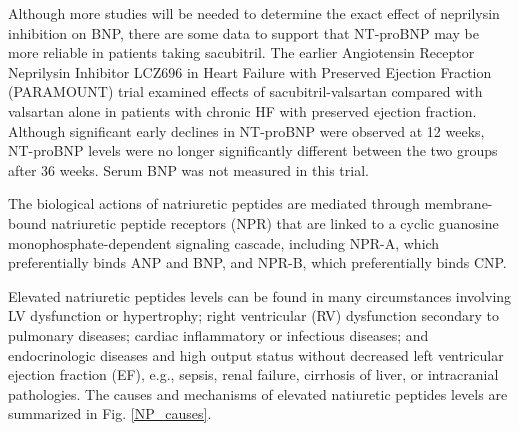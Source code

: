 \documentclass[14pt,a4paper,onecolumn]{extarticle}
\begin{document}
Although more studies will be needed to determine the exact effect of neprilysin inhibition on BNP, there are some data to support that NT-proBNP may be more reliable in patients taking sacubitril.  The earlier Angiotensin Receptor Neprilysin Inhibitor LCZ696 in Heart Failure with Preserved Ejection Fraction (PARAMOUNT) trial examined effects of sacubitril-valsartan compared with valsartan alone in patients with chronic HF with preserved ejection fraction. Although significant early declines in NT-proBNP were observed at 12 weeks, NT-proBNP levels were no longer significantly different between the two groups after 36 weeks. Serum BNP was not measured in this trial.  \citep{Maisel2018} %

The biological actions of natriuretic peptides are mediated through membrane-bound natriuretic peptide receptors (NPR) that are linked to a cyclic guanosine monophosphate-dependent signaling cascade, including NPR-A, which preferentially binds ANP and BNP, and NPR-B, which preferentially binds CNP. %



Elevated natriuretic peptides levels can be found in many circumstances involving LV dysfunction or hypertrophy; right ventricular (RV) dysfunction secondary to pulmonary diseases; cardiac inflammatory or infectious diseases; and endocrinologic diseases and high output status without decreased left ventricular ejection fraction (EF), e.g., sepsis, renal failure, cirrhosis of liver, or intracranial pathologies. The causes and mechanisms of elevated natiuretic peptides levels are summarized in Fig. \ref{NP_causes}. %
\end{document}

